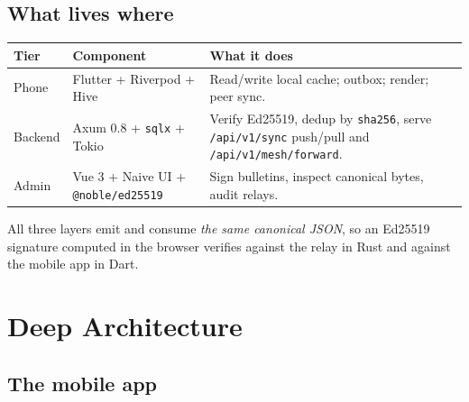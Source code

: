 \documentclass[11pt,a4paper]{article}
\begin{document}
\subsection{What lives where}
\label{sec:what-lives-where}

\begin{center}
\begin{tabularx}{\linewidth}{@{}l p{4.2cm} X@{}}
\toprule
\textbf{Tier} & \textbf{Component} & \textbf{What it does}\\
\midrule
Phone &
Flutter + Riverpod + Hive &
Read/write local cache; outbox; render; peer sync.\\
Backend &
Axum 0.8 + \texttt{sqlx} + Tokio &
Verify Ed25519, dedup by \texttt{sha256}, serve
\texttt{/api/v1/sync} push/pull and \texttt{/api/v1/mesh/forward}.\\
Admin &
Vue 3 + Naive UI + \texttt{@noble/ed25519} &
Sign bulletins, inspect canonical bytes, audit relays.\\
\bottomrule
\end{tabularx}
\end{center}

All three layers emit and consume \emph{the same canonical JSON},
so an Ed25519 signature computed in the browser verifies against the
relay in Rust and against the mobile app in Dart.

\section{Deep Architecture}
\label{sec:arch}

\subsection{The mobile app}
\label{sec:mobile}
\end{document}
